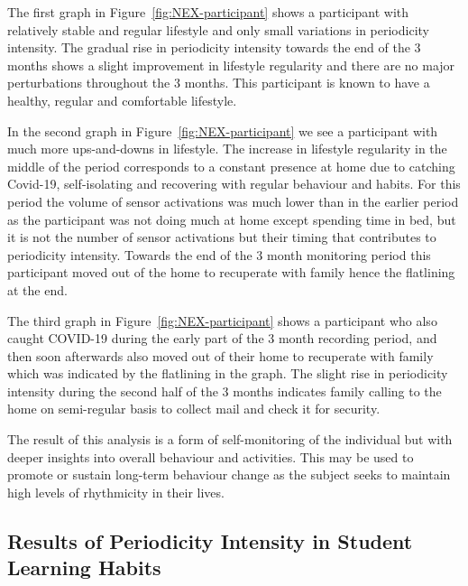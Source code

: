 \documentclass[preprints,article,accept,pdftex,moreauthors]{Definitions/mdpi}
\begin{document}
The first graph in Figure~\ref{fig:NEX-participant} shows a participant with relatively stable and regular lifestyle and only small variations in periodicity intensity. The gradual rise in periodicity intensity towards the end of the 3 months shows a slight improvement in lifestyle regularity and there are no major perturbations throughout the 3 months. This participant is known to have a healthy, regular and comfortable lifestyle.

In the second graph in Figure~\ref{fig:NEX-participant} we see a participant with much more ups-and-downs in lifestyle. The increase in lifestyle regularity in the middle of the period corresponds to a constant presence at home due to catching Covid-19, self-isolating and recovering with regular behaviour and habits.  For this period the volume of sensor activations was much lower than in the earlier period as the participant was not doing much at home except spending time in bed, but it is not the number of sensor activations but their timing that contributes to periodicity intensity. Towards the end of the 3 month monitoring period this participant moved out of the home to recuperate with family {hence the flatlining at the end}.

The third graph in Figure~\ref{fig:NEX-participant} shows a participant who also caught COVID-19 during the early part of the 3 month recording period, and then soon afterwards also moved out of the{ir} home to recuperate with family which was indicated by the flatlining in the graph. The slight rise in periodicity intensity during the second half of the 3 months indicates family calling to the home on semi-regular basis to collect mail and check it for security. 

The result of this analysis is a form of self-monitoring {of the individual} but with deeper insights into overall behaviour and activities. This may be used to promote or sustain long-term behaviour change as the subject seeks to maintain
high levels of rhythmicity in their lives. 


\subsection{Results of Periodicity Intensity in Student Learning Habits}
\end{document}
